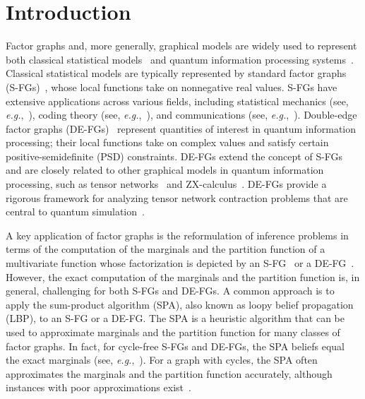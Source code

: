 \documentclass[journal]{IEEEtran}
\newcommand{\add}[1]{{\color{black}#1}}
\newcommand*{\eg}{\textit{e.g.}}
\begin{document}
\section{Introduction}

\label{sec:introduction:1}

Factor graphs and, more generally, graphical models are widely used \add{to
  represent} both classical statistical models~\cite{Kschischang2001,
  Forney2001,Loeliger2004} and quantum information processing
systems~\cite{Cao2017,Alkabetz2021}. \add{Classical statistical models are
  typically represented by standard factor graphs
  (S-FGs)~\cite{Kschischang2001, Forney2001,Loeliger2004}, whose local
  functions take on nonnegative real values.} S-FGs have extensive
applications across various fields, including statistical mechanics (see,
\eg,~\cite{Mezard2009}), coding theory (see, \eg,~\cite{Richardson2008}), and
communications (see, \eg,~\cite{Wymeersch2007}). Double-edge factor graphs
(DE-FGs)~\cite{Cao2017,Cao2021} represent quantities of interest in quantum
information processing; their local functions take on complex values and
satisfy certain positive-semidefinite \add{(PSD)} constraints.  DE-FGs extend
the concept of S-FGs and are closely related to other graphical models in
quantum information processing, such as tensor
networks~\cite{Cirac2009,Coecke2010,Robeva2019,Alkabetz2021} and
ZX-calculus~\cite{Coecke2008,Coecke2011}. DE-FGs provide a rigorous framework
for analyzing tensor network contraction problems that are central to quantum
simulation~\cite{Alkabetz2021}.

\add{A key application of factor graphs is the reformulation of inference
  problems in terms of the computation of the marginals and the partition
  function} of a multivariate function whose factorization is depicted by an
S-FG~\cite{Kschischang2001,Loeliger2004} or a
DE-FG~\cite{Alkabetz2021}. However, the exact computation of the marginals and
the partition function is, in general, challenging for both S-FGs and
DE-FGs. \add{A common approach is to apply the sum-product algorithm (SPA),
  also known as loopy belief propagation (LBP), to an S-FG or a DE-FG. The SPA
  is a heuristic algorithm that can be used to approximate marginals and the
  partition function for many classes of factor graphs. In fact, for
  cycle-free S-FGs and DE-FGs, the SPA beliefs equal the exact marginals (see,
  \eg,~\cite{Mezard2009}). For a graph with cycles, the SPA often approximates
  the marginals and the partition function accurately, although instances with
  poor approximations exist~\cite{Murphy1999,Heskes2003,Weller2014}.}
\end{document}
